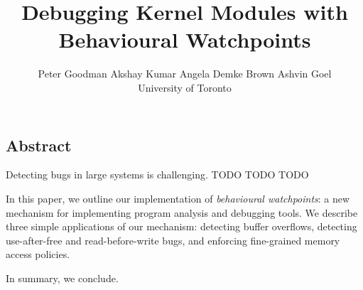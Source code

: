 \documentclass[letterpaper,twocolumn,10pt]{article}
\begin{document}
\date{}

\title{\Large \bf Debugging Kernel Modules with Behavioural Watchpoints}

\author{
{\rm Peter Goodman} \hspace{1.5em} {\rm Akshay Kumar} \hspace{1.5em} {\rm Angela Demke Brown} \hspace{1.5em} {\rm Ashvin Goel}\\
University of Toronto
} %


\maketitle
\subsection*{Abstract}

Detecting bugs in large systems is challenging. TODO TODO TODO

In this paper, we outline our implementation of \emph{behavioural watchpoints}: a new mechanism for implementing program analysis and debugging tools. We describe three simple applications of our mechanism: detecting buffer overflows, detecting use-after-free and read-before-write bugs, and enforcing fine-grained memory access policies. 

In summary, we conclude.


\end{document}
